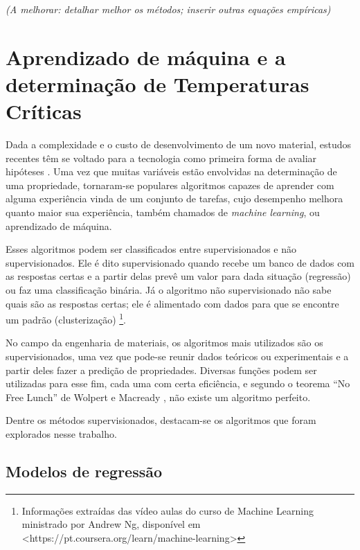 \documentclass[brazil,tf,epusp]{usp}  %
\begin{document}
\textit{(A melhorar: detalhar melhor os métodos; inserir outras equações empíricas)}

\section{Aprendizado de m\'aquina e a determinação de Temperaturas Cr\'iticas}

Dada a complexidade e o custo de desenvolvimento de um novo material, estudos recentes têm se voltado para a tecnologia como primeira forma de avaliar hipóteses \cite{Belisle2015}. Uma vez que muitas variáveis estão envolvidas na determinação de uma propriedade, tornaram-se populares algoritmos capazes de aprender com alguma experiência vinda de um conjunto de tarefas, cujo desempenho melhora quanto maior sua experiência, também chamados de \textit{machine learning}, ou aprendizado de máquina.

Esses algoritmos podem ser classificados entre supervisionados e não supervisionados. Ele é dito supervisionado quando recebe um banco de dados com as respostas certas e a partir delas prevê um valor para dada situação (regressão) ou faz uma classificação binária. Já o algoritmo não supervisionado não sabe quais são as respostas certas; ele é alimentado com dados para que se encontre um padrão (clusterização) \footnote{Informações extraídas das vídeo aulas do curso de Machine Learning ministrado por Andrew Ng, disponível em <https://pt.coursera.org/learn/machine-learning>}.

No campo da engenharia de materiais, os algoritmos mais utilizados são os supervisionados, uma vez que pode-se reunir dados teóricos ou experimentais e a partir deles fazer a predição de propriedades. Diversas funções podem ser utilizadas para esse fim, cada uma com certa eficiência, e segundo o teorema ``No Free Lunch'' de Wolpert e Macready  , não existe um algoritmo perfeito.

Dentre os métodos supervisionados, destacam-se os algoritmos que foram explorados nesse trabalho.

\subsection{Modelos de regress\~ao}

\end{document}
